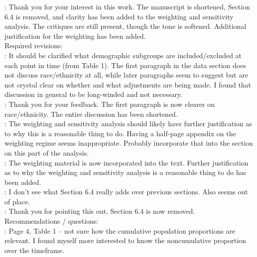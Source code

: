 \documentclass[11pt]{article}
\begin{document}
: Thank you for your interest in this work.  The 
manuscript is shortened, Section 6.4 is removed, and clarity has been added 
to the weighting and sensitivity analysis.  The critiques are still present, 
though the tone is softened.  Additional justification for the weighting has 
been added. \\



Required revisions: \\

:
It should be clarified what demographic subgroups are included/excluded at 
each point in time (from Table 1).  The first paragraph in the data section 
does not discuss race/ethnicity at all, while later paragraphs seem to suggest 
but are not crystal clear on whether and what adjustments are being made.  
I found that discussion in general to be long-winded and not necessary. \\

: Thank you for your feedback.  The first paragraph is 
now clearer on race/ethnicity.  The entire discussion has been shortened.  \\



:
The weighting and sensitivity analysis should likely have further 
justification as to why this is a reasonable thing to do.  Having a 
half-page appendix on the weighting regime seems inappropriate.  Probably 
incorporate that into the section on this part of the analysis. \\

: The weighting material is now incorporated into the 
text.  Further justification as to why the weighting and sensitivity 
analysis is a reasonable thing to do has been added. \\



: I don’t see what Section 6.4 really adds over 
previous sections.  Also seems out of place. \\

: Thank you for pointing this out, Section 6.4 
is now removed. \\



Recommendations / questions: \\

:
Page 4, Table 1 -- not sure how the cumulative population proportions are 
relevant.  I found myself more interested to know the noncumulative proportion 
over the timeframe. \\
\end{document}
